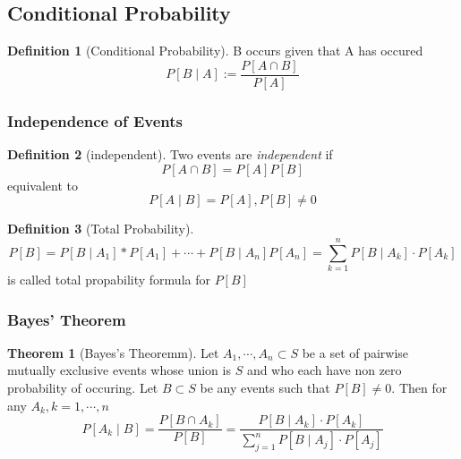 \documentclass{article}
\theoremstyle{definition}
\newtheorem{definition}{Definition}[subsection]
\newtheorem{theorem}{Theorem}[subsection]
\begin{document}
\subsection{Conditional Probability}
\begin{definition}[Conditional Probability]
    B occurs given that A has occured
    \begin{equation}
        P[B \mid A] := \frac{P[A \cap B]}{P[A]}
    \end{equation} 
\end{definition}
\subsubsection{Independence of Events}
\begin{definition}[independent]
    Two events are \emph{independent} if
    \begin{equation}
        P[A\cap B]=P[A]P[B]
    \end{equation}
    equivalent to
    \begin{equation}
        P[A\mid B] = P[A], P[B] \neq 0
    \end{equation}
\end{definition}
\begin{definition}[Total Probability]
    \begin{equation}
        P[B] = P[B\mid A_1]*P[A_1]+\dotsm+P[B\mid A_n]P[A_n] = \sum_{k=1}^{n} P[B\mid A_k]\cdot P[A_k]
    \end{equation}
    is called total propability formula for $P[B]$
\end{definition}
\subsubsection{Bayes' Theorem}
\begin{theorem}[Bayes's Theoremm]
    Let $A_1,\dotsm, A_n \subset S$ be a set of pairwise mutually exclusive events whose union is $S$ and who each have non zero probability of occuring. Let $B\subset S$ be any events such that $P[B] \neq 0$. Then for any $A_k, k=1,\dotsm,n$
    \begin{equation}
        P[A_k\mid B] = \frac{P[B\cap A_k]}{P[B]} = \frac{P[B\mid A_k]\cdot P[A_k]}{\sum_{j=1}^{n} P[B\mid A_j]\cdot P[A_j]}
    \end{equation}
\end{theorem}
\end{document}
